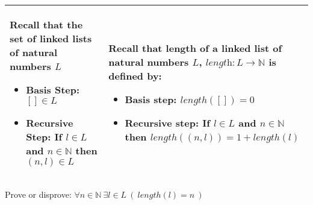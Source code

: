 \documentclass[12pt, oneside]{article}
\begin{document}
\begin{center}
\begin{tabular}{|p{3.5in}|p{3.5in}|}
\hline
Recall that the set of linked lists of natural numbers $L$

\vspace{-10pt}

\begin{itemize}
\item[] Basis Step: $[] \in L$

\vspace{-10pt}

\item[] Recursive Step: If $l \in L$ and $n \in \mathbb{N}$ then $(n, l) \in L$
\end{itemize}

\vspace{-20pt}

&
Recall that length of a linked list of natural numbers $L$, $\textit{length}: L \to \mathbb{N}$ is defined by:

\vspace{-10pt}

\begin{itemize}
\item[] Basis step: $length([]) = 0 $

\vspace{-10pt}

\item[] Recursive step: If $l \in L$ and $n \in \mathbb{N}$ then $length((n, l)) = 1+ length(l)$
\end{itemize}

\vspace{-20pt}

\\
\hline
\end{tabular}
\end{center}

\vspace{-10pt}

Prove or disprove: $\forall n \in \mathbb{N} ~\exists l \in L ~(~length(l) = n~)$


\vfill
\vfill
\vfill


\newpage
\end{document}
